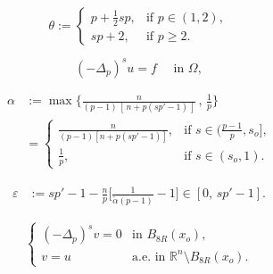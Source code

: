 \documentclass[10pt,a4paper]{amsart}
\begin{document}
\begin{equation}\label{def:theta}
    \theta :=
    \left\{
    \begin{array}{cl}
        p+\frac12 sp, & \text{if } p\in(1,2),\\[3pt]
        sp+2, & \text{if } p\ge2.
    \end{array}
    \right.
\end{equation}

\begin{equation} \label{eq:frac-p}
        \left( - \Delta_p\right)^s u = f \quad \text{ in } \Omega,
\end{equation}

\begin{align}\label{def:alpha}
    \alpha 
    &:=
    \max\bigg\{\frac{n}{(p-1)\,[\,n+p(sp'-1)\,]}\,,\, \frac{1}{p}\bigg\} \nonumber \\[6pt]
    &=\left\{
    \begin{array}{cl}
    \displaystyle
        \frac{n}{(p-1)[n+p(sp'-1)]}, & \mbox{if $\displaystyle s\in(\tfrac{p-1}{p},s_o]$,}\\[12pt]
        \displaystyle\frac{1}{p}, &  \mbox{if $\displaystyle s\in(s_o,1)$.}
    \end{array}
    \right.
\end{align}

\begin{align}\label{def:eps}
    \varepsilon
    &:=
    sp' - 1 - \frac{n}{p}\bigg[\frac{1}{\tilde\alpha (p-1)}-1\bigg]
    \in [0,\, sp'-1].
\end{align}

\begin{equation}\label{CD-v}
\left\{
    \begin{array}{cl}
      (-\Delta_p)^s v = 0 & \text{in } B_{8R}(x_o), \\[6pt]
      v = u & \text{a.e.\ in } \mathbb{R}^n\setminus B_{8R}(x_o).
    \end{array}
\right.
\end{equation}
\end{document}
